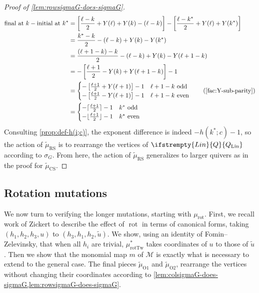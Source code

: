 \documentclass{amsart}
\theoremstyle{plain}
\theoremstyle{definition}
\theoremstyle{remark}
\newcommand{\conftoquiv}{\mathcal{M}}
\newcommand{\monomialmap}{m}
\newcommand{\murottwistind}{{\mu_{\text{rotTw}}^{\ast}}}
\newcommand{\Q}[1]{\ifstrempty{#1}{Q}{Q_{\text{#1}}}}
\newcommand{\murot}{{\mu_{\text{rot}}}}
\newcommand{\muint}[1]{\widetilde{\mu}_{\text{#1}}}
\newcommand{\murowperm}{\muint{RS}}
\newcommand{\mucolperm}{\muint{CS}}
\begin{document}
\begin{proof}[Proof of \cref{lem:rowsigmaG-does-sigmaG}]
    \begin{align*}
      \text{final at $k$} - \text{initial at $k^{\ast}$} &= \left[ \frac{\ell - k}{2} + Y(\ell) + Y(k) - (\ell - k) \right] - \left[\frac{\ell - k^{\ast}}{2} + Y(\ell) + Y(k^{\ast}) \right] \\
      &= \frac{k^{\ast} - k}{2} - (\ell - k) + Y(k) - Y(k^{\ast}) \\
      &= \frac{(\ell + 1 - k) - k}{2} - (\ell - k) + Y(k) - Y(\ell + 1 - k) \\
      &= -\left[\frac{\ell + 1}{2} - Y(k) + Y(\ell + 1 - k)\right] - 1 \\
      &= \begin{cases} -\left[ \frac{\ell + 1}{2} + Y(\ell + 1)\right] - 1 & \text{$\ell + 1 - k$ odd} \\ -\left[ \frac{\ell + 1}{2} - Y(\ell + 1)\right] - 1 & \text{$\ell + 1 - k$ even}\end{cases} \tag{\Cref{fac:Y-sub-parity}} \\
      &= \begin{cases} -\lceil\frac{\ell + 1}{2}\rceil - 1 & \text{$k^{\ast}$ odd} \\ -\lfloor \frac{\ell + 1}{2}\rfloor - 1 & \text{$k^{\ast}$ even}\end{cases} \\
    \end{align*}
    Consulting \cref{prop:def-h(i;c)}, the exponent difference is indeed
    $-h(k^{\ast};c) - 1$, so the action of $\murowperm$ is to rearrange
    the vertices of $\Q{Lin}$ according to $\sigma_G$. From here, the
    action of $\murowperm$ generalizes to larger quivers as in the proof
    for $\mucolperm$.
  \end{proof}

  \subsection{Rotation mutations}

  \label{sec:proof-of-rot}

  We now turn to verifying the longer mutations, starting with $\murot$.
  First, we recall work of Zickert to describe the effect of
  $\operatorname{rot}$ in terms of canonical forms, taking $(h_1, h_2,
  h_3, u)$ to $(h_3, h_1, h_2, \widetilde{u})$. We show, using an
  identity of Fomin--Zelevinsky, that when all $h_i$ are trivial,
  $\murottwistind$ takes coordinates of $u$ to those of $\widetilde{u}$.
  Then we show that the monomial map $\monomialmap$ of $\conftoquiv$ is
  exactly what is necessary to extend to the general case. The final
  pieces $\muint{O1}$ and $\muint{O2}$, rearrange the vertices without
  changing their coordinates according to
  \cref{lem:colsigmaG-does-sigmaG,lem:rowsigmaG-does-sigmaG}.
\end{document}
